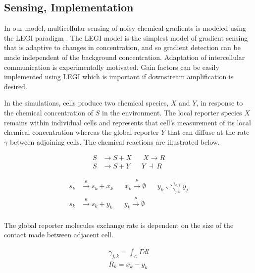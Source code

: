 \documentclass[a4paper]{article}
\begin{document}
\subsection{Sensing, Implementation}

In our model, multicellular sensing of noisy chemical gradients is modeled using the LEGI paradigm \cite{mugler2015limits,levchenko2002models}. The LEGI model is the simplest model of gradient sensing that is adaptive to changes in concentration, and so gradient detection can be made independent of the background concentration. Adaptation of intercellular communication is experimentally motivated. Gain factors can be easily implemented using LEGI which is important if downstream amplification is desired.

In the simulations, cells produce two chemical species, $X$ and $Y$, in response to the chemical concentration of $S$ in the environment. The local reporter species $X$ remains within individual cells and represents that cell’s measurement of its local chemical concentration whereas the global reporter $Y$ that can diffuse at the rate $\gamma$ between adjoining cells. The chemical reactions are illustrated below.

\begin{align*}
    S &\rightarrow S+X \hspace{20pt} X \rightarrow R \\
    S &\rightarrow S+Y \hspace{20pt} Y \ \dashv \ R
\end{align*}

\begin{equation}
    \begin{aligned}
        s_k &\xrightarrow{\kappa} s_k + x_k \hspace{20pt} x_k \xrightarrow{\mu} \emptyset \hspace{20pt} y_k \rightleftharpoons_{\gamma_{j,k}}^{\gamma_{k,j}} y_{j}\\
        s_k &\xrightarrow{\kappa} s_k + y_k \hspace{20pt} y_k \xrightarrow{\mu} \emptyset \\
    \end{aligned}
\end{equation}

The global reporter molecules exchange rate is dependent on the size of the contact made between adjacent cell.

\begin{gather}
    \gamma_{j,k} = \int_{\mathcal{C}} \Gamma dl \\
    R_k = x_k - y_k
\end{gather}
\end{document}
